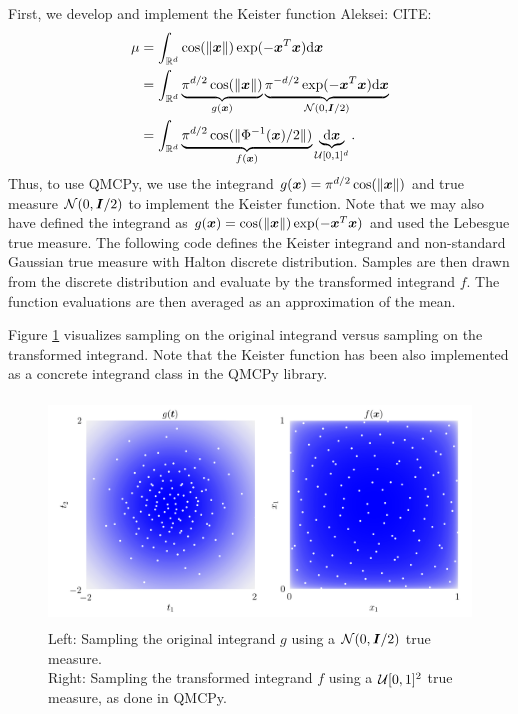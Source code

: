 \documentclass[graybox,footinfo]{svmult}
\newcommand{\AGSComment}[1]{{\color{cyan} Aleksei: #1}}
\begin{document}
First, we develop and implement the  Keister function \AGSComment{CITE}:
\begin{align*}
\mu 
&= \int_{\mathbb{R}^d} \cos(\lVert {\boldsymbol{x}} \rVert) \exp(-{\boldsymbol{x}}^T {\boldsymbol{x}}) \mathrm{d} {\boldsymbol{x}} \\ 
&= \int_{\mathbb{R}^d} \underbrace{\pi^{d/2} \cos(\lVert {\boldsymbol{x}} \rVert)}_{g({\boldsymbol{x}})} \underbrace{\pi^{-d/2} \exp(-{\boldsymbol{x}}^T {\boldsymbol{x}}) \mathrm{d} {\boldsymbol{x}}}_{{\mathcal{N}}(0,{\boldsymbol{I}}/2)} \\ 
&= \int_{\mathbb{R}^d} \underbrace{\pi^{d/2} \cos(\lVert \Phi^{-1}({\boldsymbol{x}})/2 \rVert)}_{f({\boldsymbol{x}})} \underbrace{\mathrm{d} {\boldsymbol{x}}}_{{\mathcal{U}}[0,1]^d}.
\end{align*}
Thus, to use QMCPy, we use the integrand $g({\boldsymbol{x}}) = \pi^{d/2} \cos(\lVert {\boldsymbol{x}} \rVert)$ and true measure ${\mathcal{N}}(0,{\boldsymbol{I}}/2)$ to implement the Keister function. Note that we may also have defined the integrand as $g({\boldsymbol{x}}) = \cos(\lVert {\boldsymbol{x}} \rVert)\exp(-{\boldsymbol{x}}^T{\boldsymbol{x}})$ and used the Lebesgue true measure. The following code defines the Keister integrand and non-standard Gaussian true measure with Halton discrete distribution. Samples are then drawn from the discrete distribution and evaluate by the transformed integrand $f$. The function evaluations are then averaged as an approximation of the mean.

Figure \ref{fig:ikc} visualizes sampling on the original integrand versus sampling on the transformed integrand. Note that the Keister function has been also implemented as a concrete integrand class in the QMCPy library. 
\begin{figure}
	\includegraphics[height=6cm]{ags/figs/i.keister_contours.png}
	\caption{Left: Sampling the original integrand $g$ using a ${\mathcal{N}}(0,{\boldsymbol{I}}/2)$ true measure. \\ Right: Sampling the transformed integrand $f$ using a ${\mathcal{U}}[0,1]^2$ true measure, as done in QMCPy.}
	\label{fig:ikc}
\end{figure}
\end{document}
